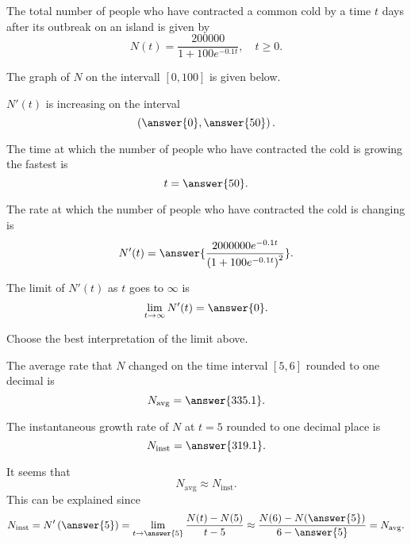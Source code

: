 \documentclass{ximera}
\author{Nela Lakos \and Kyle Parsons}
\begin{document}
\begin{exercise}

The total number of people who have contracted a common cold by a time $t$ days after its outbreak on an island is given by
\[
N(t) = \frac{200000}{1+100e^{-0.1t}},\quad t\geq0.
\]

The graph of $N$ on the intervall $[0,100]$ is given below.

\begin{image}
\end{image}

$N'(t)$ is increasing on the interval
\[
\left(\answer{0},\answer{50}\right).
\]

The time at which the number of people who have contracted the cold is growing the fastest is
\[
t = \answer{50}.
\]

The rate at which the number of people who have contracted the cold is changing is
\[
N'(t) = \answer{\frac{2000000e^{-0.1t}}{\left(1+100e^{-0.1t}\right)^2}}.
\]

The limit of $N'(t)$ as $t$ goes to $\infty$ is
\[
\lim_{t\to\infty}N'(t) = \answer{0}.
\]

Choose the best interpretation of the limit above.
\begin{multipleChoice}
\end{multipleChoice}

The average rate that $N$ changed on the time interval $[5,6]$ rounded to one decimal is
\[
N_{\text{avg}} = \answer{335.1}.
\]

The instantaneous growth rate of $N$ at $t=5$ rounded to one decimal place is
\[
N_{\text{inst}} = \answer{319.1}.
\]

It seems that 
\[
N_{\text{avg}}\approx N_{\text{inst}}.
\]
This can be explained since
\[
N_{\text{inst}} = N'\left(\answer{5}\right) = \lim_{t\to\answer{5}}\frac{N(t)-N(5)}{t-5} \approx \frac{N(6) - N(\answer{5})}{6-\answer{5}} = N_{\text{avg}}.
\]

\end{exercise}
\end{document}
